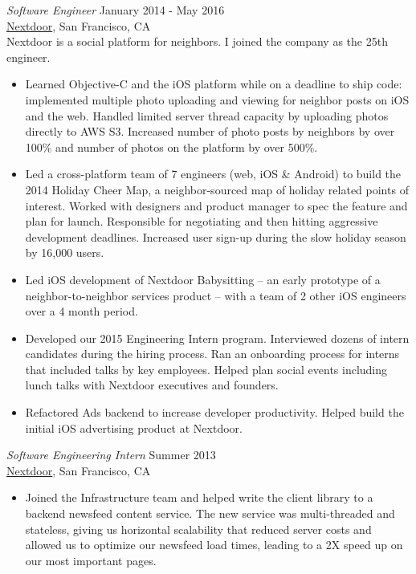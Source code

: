 \documentclass[margin, 10pt]{res}
\begin{document}
\begin{resume}
{\sl Software Engineer} \hfill January 2014 - May 2016 \\
\href{http://www.nextdoor.com}{Nextdoor}, San Francisco, CA \\
Nextdoor is a social platform for neighbors. I joined the company as the 25th engineer.
\begin{itemize} \itemsep -2pt %
\item Learned Objective-C and the iOS platform while on a deadline to ship code: implemented multiple photo uploading and viewing for neighbor posts on iOS and the web. Handled limited server thread capacity by uploading photos directly to AWS S3. Increased number of photo posts by neighbors by over 100\% and number of photos on the platform by over 500\%.
\item Led a cross-platform team of 7 engineers (web, iOS \& Android) to build the 2014 Holiday Cheer Map, a neighbor-sourced map of holiday related points of interest. Worked with designers and product manager to spec the feature and plan for launch. Responsible for negotiating and then hitting aggressive development deadlines. Increased user sign-up during the slow holiday season by 16,000 users.
\item Led iOS development of Nextdoor Babysitting -- an early prototype of a neighbor-to-neighbor services product -- with a team of 2 other iOS engineers over a 4 month period.
\item Developed our 2015 Engineering Intern program. Interviewed dozens of intern candidates during the hiring process. Ran an onboarding process for interns that included talks by key employees. Helped plan social events including lunch talks with Nextdoor executives and founders.
\item Refactored Ads backend to increase developer productivity. Helped build the initial iOS advertising product at Nextdoor.
\end{itemize}

{\sl Software Engineering Intern} \hfill Summer 2013 \\
\href{http://www.nextdoor.com}{Nextdoor}, San Francisco, CA
\begin{itemize} \itemsep -2pt %
\item Joined the Infrastructure team and helped write the client library to a backend newsfeed content service. The new service was multi-threaded and stateless, giving us horizontal scalability that reduced server costs and allowed us to optimize our newsfeed load times, leading to a 2X speed up on our most important pages.
\end{itemize}


\end{resume}
\end{document}
